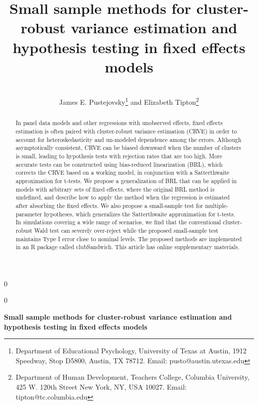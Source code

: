 \documentclass[12pt]{article}\usepackage[]{graphicx}\usepackage[]{color}
\newcommand{\blind}{0}
\begin{document}
\def\spacingset#1{\renewcommand{\baselinestretch}%
{#1}\small\normalsize} \spacingset{1}



\blind
{
  \title{\bf Small sample methods for cluster-robust variance estimation and hypothesis testing in fixed effects models}                     
  \author{\\James E. Pustejovsky\thanks{Department of Educational Psychology, University of Texas at Austin, 1912 Speedway, Stop D5800, Austin, TX 78712. Email: pusto@austin.utexas.edu}
    \hspace{.2cm}and\hspace{.2cm}
    Elizabeth Tipton\thanks{Department of Human Development, Teachers College, Columbia University, 425 W. 120th Street
New York, NY, USA 10027. Email: tipton@tc.columbia.edu}
    }
  \maketitle
} \fi

\blind
{
  \bigskip
  \bigskip
  \bigskip
  \begin{center}
    {\LARGE\bf Small sample methods for cluster-robust variance estimation and hypothesis testing in fixed effects models}
\end{center}
  \medskip
} \fi

\bigskip


\begin{abstract}
In panel data models and other regressions with unobserved effects, fixed effects estimation is often paired with cluster-robust variance estimation (CRVE) in order to account for heteroskedasticity and un-modeled dependence among the errors. 
Although asymptotically consistent, CRVE can be biased downward when the number of clusters is small, leading to hypothesis tests with rejection rates that are too high. 
More accurate tests can be constructed using bias-reduced linearization (BRL), which corrects the CRVE based on a working model, in conjunction with a Satterthwaite approximation for t-tests. 
We propose a generalization of BRL that can be applied in models with arbitrary sets of fixed effects, where the original BRL method is undefined, and describe how to apply the method when the regression is estimated after absorbing the fixed effects. 
We also propose a small-sample test for multiple-parameter hypotheses, which generalizes the Satterthwaite approximation for t-tests. 
In simulations covering a wide range of scenarios, we find that the conventional cluster-robust Wald test can severely over-reject while the proposed small-sample test maintains Type I error close to nominal levels. 
The proposed methods are implemented in an R package called clubSandwich. 
This article has online supplementary materials.
\end{abstract}
\end{document}
